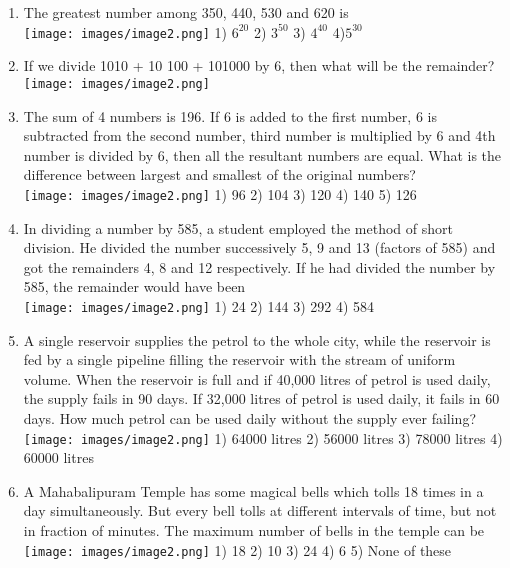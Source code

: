 \documentclass[
]{article}
\begin{document}
\begin{enumerate}
\item The greatest number among 350, 440, 530 and 620 is \\
\texttt{[image: images/image2.png]} 1) $ 6^{20} $ 2) $ 3^{50} $ 3) $4^{40}  $ 4)$ 5^{30} $ 

\item If we divide 1010 + 10 100 + 101000 by 6, then what will be the remainder? \\
\texttt{[image: images/image2.png]}




\item The sum of 4 numbers is 196. If 6 is added to the first number, 6 is subtracted from the second number, third number is multiplied by 6 and 4th number is divided by 6, then all the resultant numbers are equal. What is the difference between largest and smallest of the original numbers? \\
\texttt{[image: images/image2.png]} 1) 96 2) 104 3) 120 4) 140 5) 126


\item In dividing a number by 585, a student employed the method of short division. He divided the number successively 5, 9 and 13 (factors of 585) and got the remainders 4, 8 and 12 respectively. If he had divided the number by 585, the remainder would have been \\
\texttt{[image: images/image2.png]} 1) 24 2) 144 3) 292 4) 584


\item A single reservoir supplies the petrol to the whole city, while the reservoir is fed by a single pipeline filling the reservoir with the stream of uniform volume. When the reservoir is full and if 40,000 litres of petrol is used daily, the supply fails in 90 days. If 32,000 litres of petrol is used daily, it fails in 60 days. How much petrol can be used daily without the supply ever failing? \\
\texttt{[image: images/image2.png]} 1) 64000 litres 2) 56000 litres  3) 78000 litres 4) 60000 litres




\item A Mahabalipuram Temple has some magical bells which tolls 18 times in a day simultaneously. But every bell tolls at different intervals of time, but not in fraction of minutes. The maximum number of bells in the temple can be \\
\texttt{[image: images/image2.png]} 1) 18 2) 10 3) 24 4) 6 5) None of these



\end{enumerate}
\end{document}
